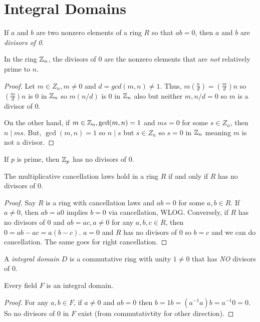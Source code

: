 \section{Integral Domains}

\begin{definition}[Divisors of 0]
    If $a$ and $b$ are two nonzero elements of a ring $R$ so that $ab = 0$, then $a$ and $b$ are \emph{divisors of 0}.
\end{definition}
\begin{theorem}
    In the ring $\mathbb{Z}_n$, the divisors of 0 are the nonzero elements that are \emph{not} relatively prime to $n$.
\end{theorem}
\begin{proof}
    Let $m \in Z_n, m \neq 0$ and $d = gcd(m,n) \neq 1$. Thus, $m\left(\frac{n}{d}\right) = \left(\frac{m}{d}\right)n$ so $(\frac{m}{d})n$ is 0 in $\mathbb{Z}_n$ so $m(n/d)$ is 0 in $\mathbb{Z}_n$ also but neither $m, n/d = 0$ so $m$ is a divisor of 0.

    On the other hand, if $m \in \mathbb{Z}_n, \gcd(m,n) = 1$ and $ms = 0$ for some $s \in Z_n$, then $n \mid ms$. But, $\gcd(m,n)=1$ so $ n\mid s$ but $s \in Z_n$ so $s = 0$ in $\mathbb{Z}_n$ meaning $m$ is not a divisor.
\end{proof}
\begin{corollary}
    If $p$ is prime, then $\mathbb{Z}_p$ has no divisors of 0.
\end{corollary}
\begin{theorem}
    The multiplicative cancellation laws hold in a ring $R$ if and only if $R$ has no divisors of 0.
\end{theorem}
\begin{proof}
    Say $R$ is a ring with cancellation laws and $ab = 0$ for some $a,b \in R$. If $a \neq 0$, then $ab = a0$ implies $b = 0$ via cancellation, WLOG. Conversely, if $R$ has no divisors of 0 and $ab = ac, a \neq 0$ for any $a,b,c \in R$, then $0 = ab - ac = a(b-c)$. $a=0$ and $R$ has no divisors of 0 so $b = c$ and we can do cancellation. The same goes for right cancellation.
\end{proof}
\begin{definition}
    A \emph{integral domain} $D$ is a commutative ring with unity $1 \neq 0$ that has \emph{NO} divisors of 0.
\end{definition}
\begin{theorem}
    Every field $F$ is an integral domain.
\end{theorem}
\begin{proof}
    For any $a, b \in F$, if $a \neq 0$ and $ab = 0$ then $b = 1b = (a^{-1}a)b = a^{-1}0 = 0.$ So no divisors of 0 in $F$ exist (from commutativtity for other direction).
\end{proof}
